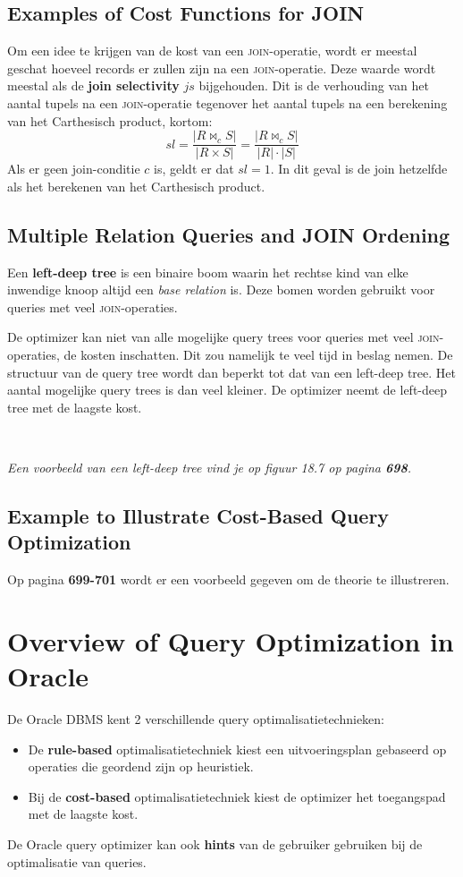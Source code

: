 \subsection{Examples of Cost Functions for JOIN}
Om een idee te krijgen van de kost van een \textsc{join}-operatie, wordt er meestal geschat hoeveel records er zullen zijn na een \textsc{join}-operatie. Deze waarde wordt meestal als de \textbf{join selectivity} $\textit{js}$ bijgehouden. Dit is de verhouding van het aantal tupels na een \textsc{join}-operatie tegenover het aantal tupels na een berekening van het Carthesisch product, kortom:
\vspace{-2mm}
\[ \textit{sl} = \dfrac{ |R \bowtie_c S| }{ |R \times S| } = \dfrac{ |R \bowtie_c S| }{ |R|\cdot|S| } \]
Als er geen join-conditie $c$ is, geldt er dat $\textit{sl} = 1$. In dit geval is de join hetzelfde als het berekenen van het Carthesisch product.


\subsection{Multiple Relation Queries and JOIN Ordening}
Een \textbf{left-deep tree} is een binaire boom waarin het rechtse kind van elke inwendige knoop altijd een \textit{base relation} is. Deze bomen worden gebruikt voor queries met veel \textsc{join}-operaties.

De optimizer kan niet van alle mogelijke query trees voor queries met veel \textsc{join}-operaties, de kosten inschatten. Dit zou namelijk te veel tijd in beslag nemen. De structuur van de query tree wordt dan beperkt tot dat van een left-deep tree. Het aantal mogelijke query trees is dan veel kleiner. De optimizer neemt de left-deep tree met de laagste kost.

~

\noindent \textit{Een voorbeeld van een left-deep tree vind je op figuur 18.7 op pagina \textbf{698}.}


\subsection{Example to Illustrate Cost-Based Query Optimization}
Op pagina \textbf{699-701} wordt er een voorbeeld gegeven om de theorie te illustreren.



\section{Overview of Query Optimization in Oracle}
De Oracle DBMS kent 2 verschillende query optimalisatietechnieken:
\begin{itemize}
	\item De \textbf{rule-based} optimalisatietechniek kiest een uitvoeringsplan gebaseerd op operaties die geordend zijn op heuristiek.

	\item Bij de \textbf{cost-based} optimalisatietechniek kiest de optimizer het toegangspad met de laagste kost.
\end{itemize}
De Oracle query optimizer kan ook \textbf{hints} van de gebruiker gebruiken bij de optimalisatie van queries.



